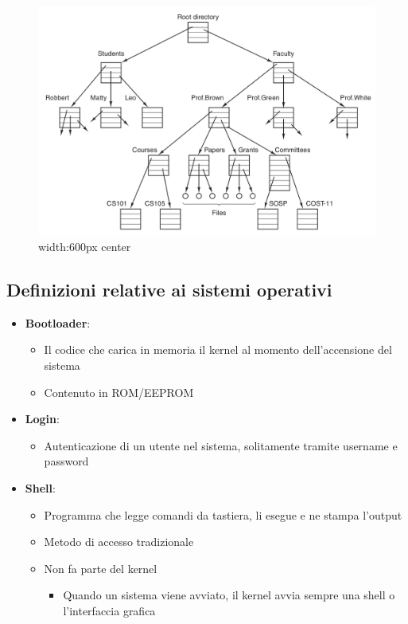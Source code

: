 \documentclass[]{article}
\providecommand{\tightlist}{%
  \setlength{\itemsep}{0pt}\setlength{\parskip}{0pt}}
\begin{document}
\begin{figure}
\centering
\includegraphics{images/tree.png}
\caption{width:600px center}
\end{figure}

\hypertarget{definizioni-relative-ai-sistemi-operativi-4}{%
\subsection{Definizioni relative ai sistemi
operativi}\label{definizioni-relative-ai-sistemi-operativi-4}}

\begin{itemize}
\tightlist
\item
  \textbf{Bootloader}:

  \begin{itemize}
  \tightlist
  \item
    Il codice che carica in memoria il kernel al momento dell'accensione
    del sistema
  \item
    Contenuto in ROM/EEPROM
  \end{itemize}
\item
  \textbf{Login}:

  \begin{itemize}
  \tightlist
  \item
    Autenticazione di un utente nel sistema, solitamente tramite
    username e password
  \end{itemize}
\item
  \textbf{Shell}:

  \begin{itemize}
  \tightlist
  \item
    Programma che legge comandi da tastiera, li esegue e ne stampa
    l'output
  \item
    Metodo di accesso tradizionale
  \item
    Non fa parte del kernel

    \begin{itemize}
    \tightlist
    \item
      Quando un sistema viene avviato, il kernel avvia sempre una shell
      o l'interfaccia grafica
    \end{itemize}
  \end{itemize}
\end{itemize}
\end{document}
